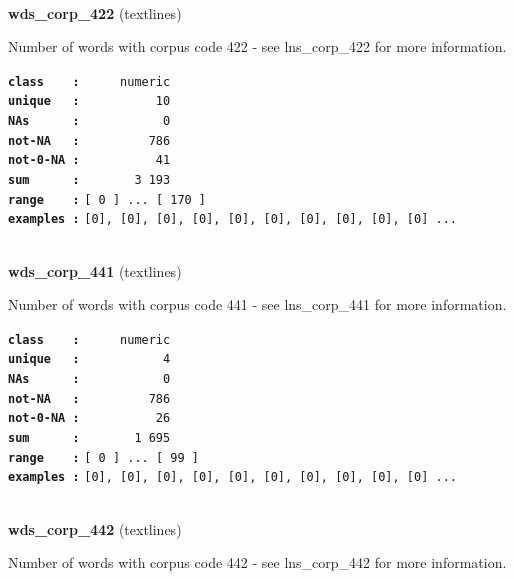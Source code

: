 \documentclass[]{article}
\begin{document}
~

\textbf{wds\_corp\_422} (textlines)

Number of words with corpus code 422 - see lns\_corp\_422 for more
information.

\textbf{\texttt{class\ \ \ \ :}} \texttt{~~~~~numeric}\\
\textbf{\texttt{unique\ \ \ :}} \texttt{~~~~~~~~~~10}\\
\textbf{\texttt{NAs\ \ \ \ \ \ :}} \texttt{~~~~~~~~~~~0}\\
\textbf{\texttt{not-NA\ \ \ :}} \texttt{~~~~~~~~~786}\\
\textbf{\texttt{not-0-NA\ :}} \texttt{~~~~~~~~~~41}\\
\textbf{\texttt{sum\ \ \ \ \ \ :}} \texttt{~~~~~~~3~193}\\
\textbf{\texttt{range\ \ \ \ :}}
\texttt{{[}\ 0\ {]}\ ...\ {[}\ 170\ {]}}\\
\textbf{\texttt{examples\ :}}
\texttt{{[}0{]},\ {[}0{]},\ {[}0{]},\ {[}0{]},\ {[}0{]},\ {[}0{]},\ {[}0{]},\ {[}0{]},\ {[}0{]},\ {[}0{]}\ ...}\\

~

\textbf{wds\_corp\_441} (textlines)

Number of words with corpus code 441 - see lns\_corp\_441 for more
information.

\textbf{\texttt{class\ \ \ \ :}} \texttt{~~~~~numeric}\\
\textbf{\texttt{unique\ \ \ :}} \texttt{~~~~~~~~~~~4}\\
\textbf{\texttt{NAs\ \ \ \ \ \ :}} \texttt{~~~~~~~~~~~0}\\
\textbf{\texttt{not-NA\ \ \ :}} \texttt{~~~~~~~~~786}\\
\textbf{\texttt{not-0-NA\ :}} \texttt{~~~~~~~~~~26}\\
\textbf{\texttt{sum\ \ \ \ \ \ :}} \texttt{~~~~~~~1~695}\\
\textbf{\texttt{range\ \ \ \ :}}
\texttt{{[}\ 0\ {]}\ ...\ {[}\ 99\ {]}}\\
\textbf{\texttt{examples\ :}}
\texttt{{[}0{]},\ {[}0{]},\ {[}0{]},\ {[}0{]},\ {[}0{]},\ {[}0{]},\ {[}0{]},\ {[}0{]},\ {[}0{]},\ {[}0{]}\ ...}\\

~

\textbf{wds\_corp\_442} (textlines)

Number of words with corpus code 442 - see lns\_corp\_442 for more
information.
\end{document}

